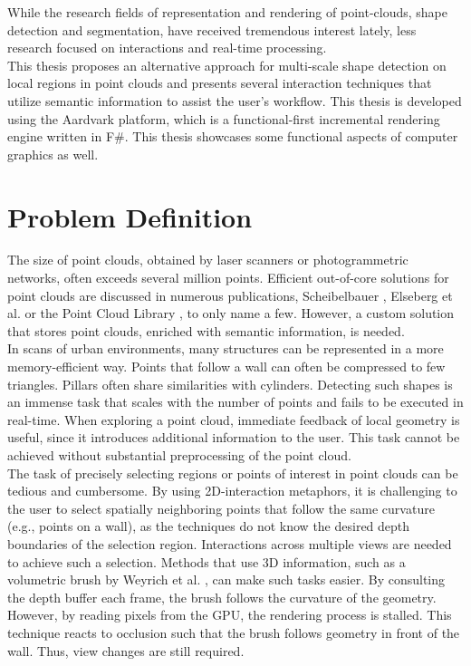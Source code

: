 While the research fields of representation and rendering of point-clouds, shape detection and segmentation, have received tremendous interest lately, less research focused on interactions and real-time processing. 
\\
This thesis proposes an alternative approach for multi-scale shape detection on local regions in point clouds and presents several interaction techniques that utilize semantic information to assist the user's workflow. This thesis is developed using the Aardvark platform, which is a functional-first incremental rendering engine written in F\#. This thesis showcases some functional aspects of computer graphics as well. 


\section{Problem Definition}

The size of point clouds, obtained by laser scanners or photogrammetric networks, often exceeds several million points. 
Efficient out-of-core solutions for point clouds are discussed in numerous publications, Scheibelbauer \cite{scheiblauer-thesis}, Elseberg et al. \cite{elseberg2013one} or the Point Cloud Library \cite{rusu20113d}, to only name a few. However, a custom solution that stores point clouds, enriched with semantic information, is needed.
\\
In scans of urban environments, many structures can be represented in a more memory-efficient way. Points that follow a wall can often be compressed to few triangles. Pillars often share similarities with cylinders. Detecting such shapes is an immense task that scales with the number of points and fails to be executed in real-time. When exploring a point cloud, immediate feedback of local geometry is useful, since it introduces additional information to the user. This task cannot be achieved without substantial preprocessing of the point cloud. 
\\
The task of precisely selecting regions or points of interest in point clouds can be tedious and cumbersome. By using 2D-interaction metaphors, it is challenging to the user to select spatially neighboring points that follow the same curvature (e.g., points on a wall), as the techniques do not know the desired depth boundaries of the selection region. Interactions across multiple views are needed to achieve such a selection.  Methods that use 3D information, such as a volumetric brush by Weyrich et al. \cite{weyrich2004post}, can make such tasks easier. By consulting the depth buffer each frame, the brush follows the curvature of the geometry. However, by reading pixels from the GPU, the rendering process is stalled. This technique reacts to occlusion such that the brush follows geometry in front of the wall. Thus, view changes are still required.


